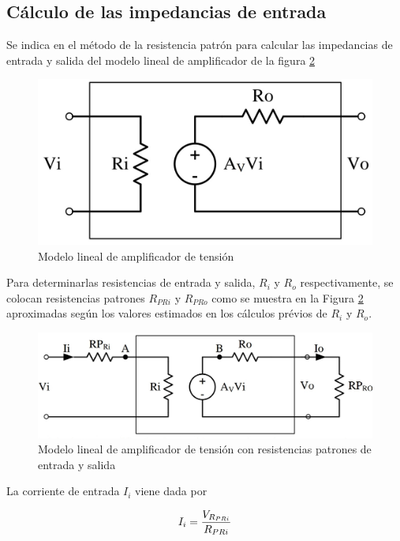 \documentclass[12pt, a4paper]{article}
\begin{document}
    \subsection{Cálculo de las impedancias de entrada}

    Se indica en \cite{panayotis} el método de la resistencia patrón para calcular las impedancias de entrada y salida del modelo lineal de amplificador de la figura \ref{fig:rp}

    \begin{figure}
        \centering
        \includegraphics[height=5cm\textwidth]{zio.jpg}
        \caption{Modelo lineal de amplificador de tensión}
        \label{fig:zio}
    \end{figure}

    Para determinarlas resistencias de entrada y salida, $R_i$ y $R_o$ respectivamente, se colocan resistencias patrones $R_{PRi}$ y $R_{PRo}$ como se muestra en la Figura \ref{fig:rp} aproximadas según los valores estimados en los cálculos prévios de $R_i$ y $R_o$.

    \begin{figure}
        \centering
        \includegraphics[height=5cm\textwidth]{RPdiagrama.jpg}
        \caption{Modelo lineal de amplificador de tensión con resistencias patrones de entrada y salida}
        \label{fig:rp}
    \end{figure}

    La corriente de entrada $I_i$ viene dada por

    $$I_i = {V_{R_{PRi}} \over R_{PRi}}$$
\end{document}
